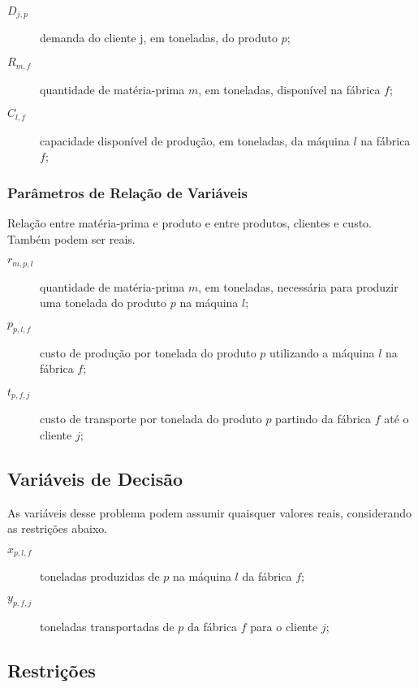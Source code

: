            \begin{description}
                \item[$D_{j,p}$] demanda do cliente j, em toneladas, do produto $p$;
                \item[$R_{m,f}$] quantidade de matéria-prima $m$, em toneladas, disponível na fábrica $f$;
                \item[$C_{l,f}$] capacidade disponível de produção, em toneladas, da máquina $l$ na fábrica $f$;
            \end{description}

        \subsubsection{Parâmetros de Relação de Variáveis}

            Relação entre matéria-prima e produto e entre produtos, clientes e custo. Também podem ser reais.

            \begin{description}
                \item[$r_{m,p,l}$]  quantidade de matéria-prima $m$, em toneladas, necessária para produzir uma tonelada do produto $p$ na máquina $l$;
                \item[$p_{p,l,f}$]  custo de produção por tonelada do produto $p$ utilizando a máquina $l$ na fábrica $f$;
                \item[$t_{p,f,j}$]  custo de transporte por tonelada do produto $p$ partindo da fábrica $f$ até o cliente $j$;
            \end{description}

    \subsection{Variáveis de Decisão}

        As variáveis desse problema podem assumir quaisquer valores reais, considerando as restrições abaixo.

        \begin{description}
            \item[$x_{p,l,f}$] toneladas produzidas de $p$ na máquina $l$ da fábrica $f$;
            \item[$y_{p,f,j}$] toneladas transportadas de $p$ da fábrica $f$ para o cliente $j$;
        \end{description}

    \subsection{Restrições}

